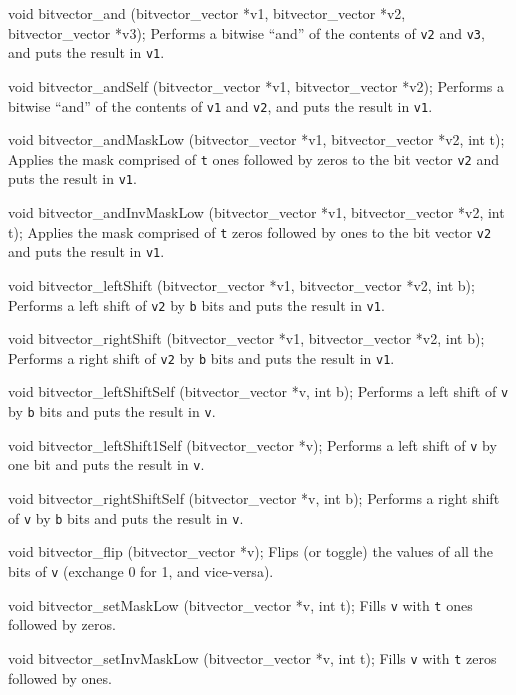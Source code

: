 void bitvector_and (bitvector_vector *v1, bitvector_vector *v2, bitvector_vector *v3);
\endcode
 \tab
Performs a bitwise ``and'' of the contents of \texttt{v2} and \texttt{v3},
and puts the result in \texttt{v1}.
 \endtab
\code

void bitvector_andSelf (bitvector_vector *v1, bitvector_vector *v2);
\endcode
 \tab
Performs a bitwise ``and'' of the contents of \texttt{v1} and \texttt{v2},
and puts the result in \texttt{v1}.
 \endtab
\code

void bitvector_andMaskLow (bitvector_vector *v1, bitvector_vector *v2, int t);
\endcode
 \tab
Applies the mask comprised of {\tt t} ones followed by zeros to the bit vector
{\tt v2} and puts the result in {\tt v1}.
\endtab
\code

void bitvector_andInvMaskLow (bitvector_vector *v1, bitvector_vector *v2, int t);
\endcode
 \tab
Applies the mask comprised of {\tt t} zeros followed by ones to the bit vector
{\tt v2} and puts the result in {\tt v1}.
 \endtab
\code

void bitvector_leftShift (bitvector_vector *v1, bitvector_vector *v2, int b);
\endcode
 \tab
Performs a left shift of \texttt{v2} by \texttt{b} bits
and puts the result in \texttt{v1}.
 \endtab
\code

void bitvector_rightShift (bitvector_vector *v1, bitvector_vector *v2, int b);
\endcode
 \tab
Performs a right shift of \texttt{v2} by \texttt{b} bits
and puts the result in \texttt{v1}.
 \endtab
\code

void bitvector_leftShiftSelf (bitvector_vector *v, int b);
\endcode
 \tab
Performs a left shift of \texttt{v} by \texttt{b} bits
and puts the result in \texttt{v}.
 \endtab
\code

void bitvector_leftShift1Self (bitvector_vector *v);
\endcode
 \tab
Performs a left shift of \texttt{v} by one bit
and puts the result in \texttt{v}.
 \endtab
\code

void bitvector_rightShiftSelf (bitvector_vector *v, int b);
\endcode
 \tab
Performs a right shift of \texttt{v} by \texttt{b} bits
and puts the result in \texttt{v}.
 \endtab
\code

void bitvector_flip (bitvector_vector *v);
\endcode
 \tab
Flips (or toggle) the values of all the bits of {\tt v} (exchange 0 for 1, and vice-versa).
 \endtab
\code

void bitvector_setMaskLow (bitvector_vector *v, int t);
\endcode
 \tab
Fills {\tt v} with {\tt t} ones followed by zeros.
 \endtab
\code

void bitvector_setInvMaskLow (bitvector_vector *v, int t);
\endcode
 \tab
Fills {\tt v} with {\tt t} zeros followed by ones.
 \endtab
\code

